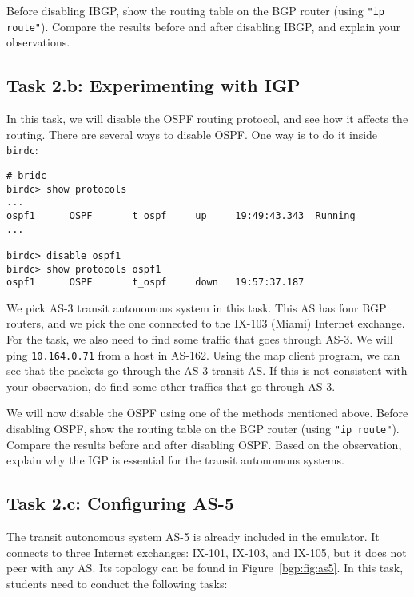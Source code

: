 Before disabling IBGP, show the routing table 
on the BGP router (using \texttt{"ip route"}). Compare the 
results before and after disabling IBGP, and explain
your observations. 


\subsection{Task 2.b: Experimenting with IGP} 

In this task, we will disable the OSPF routing protocol, and see 
how it affects the routing. There are several ways to disable
OSPF. One way is to do it inside \texttt{birdc}: 

\begin{lstlisting}
# bridc
birdc> show protocols
...
ospf1      OSPF       t_ospf     up     19:49:43.343  Running
...

birdc> disable ospf1
birdc> show protocols ospf1
ospf1      OSPF       t_ospf     down   19:57:37.187
\end{lstlisting}
 

We pick AS-3 transit autonomous system in this 
task. This AS has four BGP routers, and we pick the one 
connected to the IX-103 (Miami) Internet exchange.
For the task, we also need to find some traffic that 
goes through AS-3. 
We will ping \texttt{10.164.0.71} from a host in AS-162. Using the 
map client program, we can see that the packets go through
the AS-3 transit AS. If this is not consistent with your observation,
do find some other traffics that go through AS-3. 


We will now disable the OSPF using one of the methods mentioned above.
Before disabling OSPF, show the routing table 
on the BGP router (using \texttt{"ip route"}). Compare the 
results before and after disabling OSPF. Based on the 
observation, explain why the IGP is essential for the transit 
autonomous systems. 



\subsection{Task 2.c: Configuring AS-5} 

The transit autonomous system AS-5 is already included in the emulator. 
It connects to three 
Internet exchanges: IX-101, IX-103, and IX-105,
but it does not peer with any AS. Its topology can be found 
in Figure~\ref{bgp:fig:as5}.
In this task, students need to conduct the following tasks:

